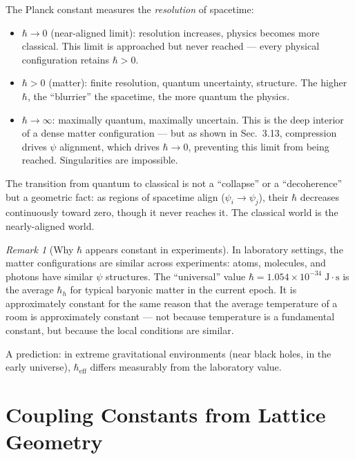 \documentclass[12pt]{article}
\theoremstyle{remark}
\newtheorem{remark}[theorem]{Remark}
\theoremstyle{definition}
\begin{document}
The Planck constant measures the \emph{resolution} of spacetime:
\begin{itemize}
\item $\hbar \to 0$ (near-aligned limit): resolution increases, physics becomes more classical. This limit is approached but never reached --- every physical configuration retains $\hbar > 0$.
\item $\hbar > 0$ (matter): finite resolution, quantum uncertainty, structure. The higher $\hbar$, the ``blurrier'' the spacetime, the more quantum the physics.
\item $\hbar \to \infty$: maximally quantum, maximally uncertain. This is the deep interior of a dense matter configuration --- but as shown in Sec.~3.13, compression drives $\psi$ alignment, which drives $\hbar \to 0$, preventing this limit from being reached. Singularities are impossible.
\end{itemize}

The transition from quantum to classical is not a ``collapse'' or a ``decoherence'' but a geometric fact: as regions of spacetime align ($\psi_i \to \psi_j$), their $\hbar$ decreases continuously toward zero, though it never reaches it. The classical world is the nearly-aligned world.

\begin{remark}[Why $\hbar$ appears constant in experiments]
In laboratory settings, the matter configurations are similar across experiments: atoms, molecules, and photons have similar $\psi$ structures. The ``universal'' value $\hbar = 1.054 \times 10^{-34}\;\text{J}\cdot\text{s}$ is the average $\hbar_h$ for typical baryonic matter in the current epoch. It is approximately constant for the same reason that the average temperature of a room is approximately constant --- not because temperature is a fundamental constant, but because the local conditions are similar.

A prediction: in extreme gravitational environments (near black holes, in the early universe), $\hbar_\text{eff}$ differs measurably from the laboratory value.
\end{remark}



\section{Coupling Constants from Lattice Geometry}
\label{ch:couplings}
\end{document}
